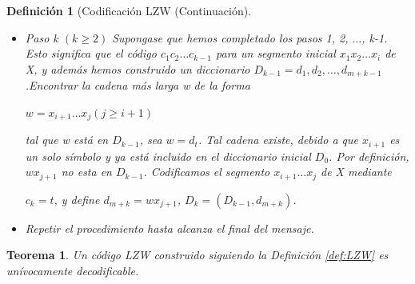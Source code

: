 \documentclass{beamer}
\theoremstyle{plain}
\newtheorem{teorema} [Teorema] {Teorema}
\newtheorem{definicion} [Definicion]{Definición}
\theoremstyle{example}
\theoremstyle{example}
\begin{document}
\begin{frame}  \small 

\begin{definicion} [Codificación LZW (Continuación] 

\begin{itemize}

\item Paso k $(k \geq 2)$ Supongase que hemos completado los pasos 1, 2, $\ldots$, k-1. Esto significa que el código $c_1 c_2 \ldots c_{k-1}$ para un segmento inicial $x_1 x_2 \ldots x_i$ de X, y además hemos construido un diccionario $D_{k-1}= d_1, d_2, \ldots, d_{m+k-1}$.Encontrar la cadena más larga w de la forma

\begin{center}
$w = x_{i+1} \ldots x_j	(j \geq i + 1)$
\end{center}

tal que w está en $D_{k-1}$, sea $w=d_t$. Tal cadena existe, debido a que $x_{i+1}$ es un solo símbolo y ya está incluido en el diccionario inicial $D_0$. Por definición, $wx_{j+1}$ no esta en $D_{k-1}$.  Codificamos el segmento $x_{i+1}\ldots x_j$ de X mediante 

\begin{center}
$c_k = t$,	y define $d_{m+k} = wx_{j+1}$,	$D_k = (D_{k-1}, d_{m+k})$.
\end{center}

\item Repetir el procedimiento hasta alcanza el final del mensaje.

\end{itemize}

\end{definicion}

\begin{teorema}
Un código LZW construido siguiendo la Definición \ref{def:LZW} es unívocamente decodificable.
\end{teorema}


\end{frame} 
\end{document}
